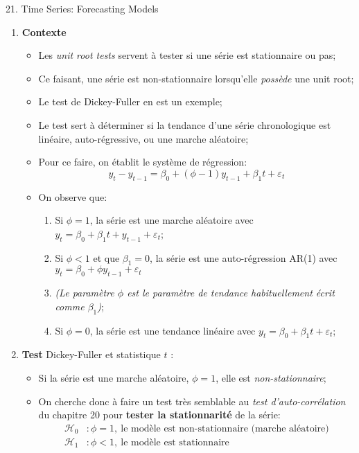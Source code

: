 \documentclass[12pt, titlepage, french]{report}
\begin{document}
\begin{CHPT_SUMM}[label = {timeseries21}]{21. Time Series: Forecasting Models}
\begin{enumerate}
	\item[]	\textbf{Contexte}
		\begin{itemize}
		\item	Les \textit{unit root tests} servent à tester si une série est stationnaire ou pas;
		\item	Ce faisant, une série est non-stationnaire lorsqu'elle \textit{possède} une unit root;
		\item	Le test de Dickey-Fuller en est un exemple;
		\item	Le test sert à déterminer si la tendance d'une série chronologique est linéaire, auto-régressive, ou une marche aléatoire;	
		\item	Pour ce faire, on établit le système de régression:
			\begin{equation*}
			y_{t} - y_{t - 1}	
			=	\beta_{0} + (\phi - 1) y_{t - 1} + \beta_{1} t + \varepsilon_{t}
			\end{equation*}
		\item[]	On observe que: 
			\begin{enumerate}
			\item	Si $\phi = 1$, la série est une marche aléatoire avec $y_{t} = \beta_{0} + \beta_{1} t + y_{t - 1} + \varepsilon_{t} $;
			\item	Si $\phi < 1$ et que $\beta_{1} = 0$, la série est une auto-régression AR(1) avec $y_{t} = \beta_{0} + \phi y_{t - 1} + \varepsilon_{t}$ 
			\item[]	\textit{(Le paramètre $\phi$ est le paramètre de tendance habituellement écrit comme $\beta_{1}$)};
			\item	Si $\phi = 0$, la série est une tendance linéaire avec $y_{t} = \beta_{0} + \beta_{1} t + \varepsilon_{t} $;
			\end{enumerate}
		\end{itemize}
	\item[]	\textbf{Test} Dickey-Fuller et statistique $t$ :
		\begin{itemize}
		\item[]	Si la série est une marche aléatoire, $\phi = 1$, elle est \textit{non-stationnaire};
		\item	On cherche donc à faire un test très semblable au \textit{test d'auto-corrélation} du chapitre 20 pour \textbf{tester la stationnarité} de la série:
		\setlength{\mathindent}{-2cm}
			\begin{align*}
			\mathcal{H}_{0} &:	\phi = 1, \ \text{le modèle est non-stationnaire (marche aléatoire)}	\\
			\mathcal{H}_{1} &:	\phi < 1, \ \text{le modèle est stationnaire}	

\end{align*}
\end{itemize}
\end{enumerate}
\end{CHPT_SUMM}
\end{document}
